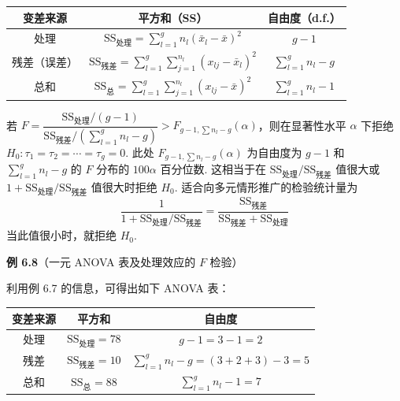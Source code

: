 \begin{mvtable}
\begin{tabular}{ccc}
\toprule
变差来源 & 平方和（SS） & 自由度（d.f.）\\
\midrule
处理 & $\mathrm{SS}_{\text{处理}}=\sum\limits_{l=1}^g n_l(\bar{x}_l-\bar{x})^2$ & $g-1$\\
残差（误差） & $\mathrm{SS}_{\text{残差}}=\sum\limits_{l=1}^g\sum\limits_{j=1}^{n_l}(x_{lj}-\bar{x}_l)^2$ & $\sum\limits_{l=1}^g n_l-g$\\
\midrule
总和 & $\mathrm{SS}_{\text{总}}=\sum\limits_{l=1}^g\sum\limits_{j=1}^{n_l}(x_{lj}-\bar{x})^2$ & $\sum\limits_{l=1}^g n_l-1$\\
\bottomrule
\end{tabular}
\end{mvtable}

若 $F=\dfrac{\mathrm{SS}_{\text{处理}}/(g-1)}{\mathrm{SS}_{\text{残差}}\big/\left(\sum\limits_{l=1}^g n_l-g\right)}>F_{g-1,\sum n_l-g}(\alpha)$，则在显著性水平 $\alpha$ 下拒绝 $H_0: \tau_1=\tau_2=\cdots=\tau_g=0$. 此处 $F_{g-1,\sum n_l-g}(\alpha)$ 为自由度为 $g-1$ 和 $\sum\limits_{l=1}^g n_l-g$ 的 $F$ 分布的 $100\alpha$ 百分位数. 这相当于在 $\mathrm{SS}_{\text{处理}}/\mathrm{SS}_{\text{残差}}$ 值很大或 $1+\mathrm{SS}_{\text{处理}}/\mathrm{SS}_{\text{残差}}$ 值很大时拒绝 $H_0$. 适合向多元情形推广的检验统计量为
\label{eq:6-37}
\begin{equation}
\frac{1}{1+\mathrm{SS}_{\text{处理}}/\mathrm{SS}_{\text{残差}}}=\frac{\mathrm{SS}_{\text{残差}}}{\mathrm{SS}_{\text{残差}}+\mathrm{SS}_{\text{处理}}} \tag{6-37}
\end{equation}
当此值很小时，就拒绝 $H_0$.

\noindent\textbf{例 6.8}\quad （一元 ANOVA 表及处理效应的 $F$ 检验）

利用例 6.7 的信息，可得出如下 ANOVA 表：

\begin{mvtable}
\begin{tabular}{ccc}
\toprule
变差来源 & 平方和 & 自由度\\
\midrule
处理 & $\mathrm{SS}_{\text{处理}}=78$ & $g-1=3-1=2$\\
残差 & $\mathrm{SS}_{\text{残差}}=10$ & $\sum\limits_{l=1}^g n_l-g=(3+2+3)-3=5$\\
\midrule
总和 & $\mathrm{SS}_{\text{总}}=88$ & $\sum\limits_{l=1}^g n_l-1=7$\\
\bottomrule
\end{tabular}
\end{mvtable}

